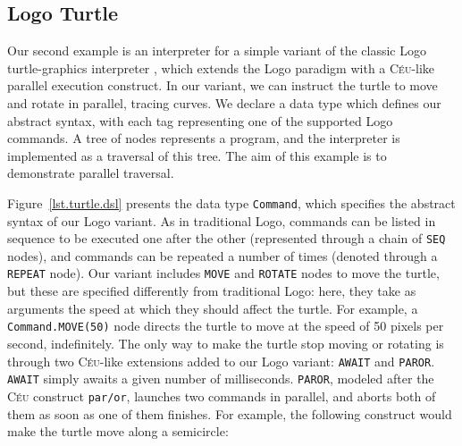 \documentclass{sig-alternate}
\newcommand{\CEU}{\textsc{C\'{e}u}\xspace}
\newcommand{\code}[1] {{\small{\texttt{#1}}}}
\begin{document}

\subsection{Logo Turtle}

Our second example is an interpreter for a simple variant of the classic Logo
turtle-graphics interpreter \cite{papert.logo}, which extends the Logo
paradigm with a \CEU-like parallel execution construct. In our variant, we can
instruct the turtle to move and rotate in parallel, tracing curves. We declare
a data type which defines our abstract syntax, with each tag representing one
of the supported Logo commands. A tree of nodes represents a program, and the
interpreter is implemented as a traversal of this tree. The aim of this
example is to demonstrate parallel traversal.

Figure~\ref{lst.turtle.dsl} presents the data type \code{Command}, which
specifies the abstract syntax of our Logo variant. As in traditional Logo,
commands can be listed in sequence to be executed one after the other
(represented through a chain of \code{SEQ} nodes), and commands can be
repeated a number of times (denoted through a \code{REPEAT} node). Our variant
includes \code{MOVE} and \code{ROTATE} nodes to move the turtle, but these are
specified differently from traditional Logo: here, they take as arguments the
speed at which they should affect the turtle. For example, a
\code{Command.MOVE(50)} node directs the turtle to move at the speed of 50
pixels per second, indefinitely. The only way to make the turtle stop moving
or rotating is through two \CEU-like extensions added to our Logo variant:
\code{AWAIT} and \code{PAROR}. \code{AWAIT} simply awaits a given number of
milliseconds. \code{PAROR}, modeled after the \CEU construct \code{par/or},
launches two commands in parallel, and aborts both of them as soon as one of
them finishes. For example, the following construct would make the turtle move
along a semicircle:
\end{document}
